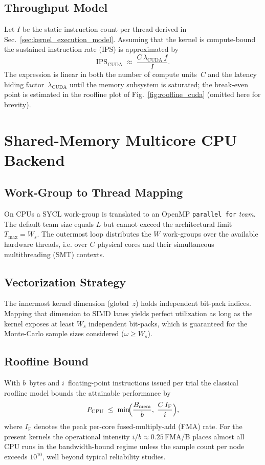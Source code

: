 \subsection{Throughput Model}
Let $I$ be the static instruction count per thread derived in
Sec.~\ref{sec:kernel_execution_model}.  Assuming that the kernel is
compute-bound the sustained instruction rate (IPS) is approximated by
\[
  \text{IPS}_{\text{CUDA}} \;\approx\; \frac{C\,\lambda_{\text{CUDA}}\,f}{I}.
\]
The expression is linear in both the number of compute units~$C$ and the
latency hiding factor~$\lambda_{\text{CUDA}}$ until the memory subsystem is
saturated; the break-even point is estimated in the roofline plot of
Fig.~\ref{fig:roofline_cuda} (omitted here for brevity).

\section{Shared-Memory Multicore CPU Backend}
\label{subsec:cpu_backend}

\subsection{Work-Group to Thread Mapping}
On CPUs a SYCL work-group is translated to an OpenMP \verb|parallel for|
\emph{team}.  The default team size equals $L$ but cannot exceed the
architectural limit $T_{\max}=W_s$.  The outermost loop distributes the $W$
work-groups over the available hardware threads, i.e. over $C$ physical cores
and their simultaneous multithreading (SMT) contexts.

\subsection{Vectorization Strategy}
The innermost kernel dimension (global~$z$) holds independent bit-pack
indices.  Mapping that dimension to SIMD lanes yields perfect utilization as
long as the kernel exposes at least $W_s$ independent bit-packs, which is
guaranteed for the Monte-Carlo sample sizes considered ($\omega\ge W_s$).

\subsection{Roofline Bound}
With $b$~bytes and $i$~floating-point instructions issued per trial the classical roofline
model bounds the attainable performance by
\[
  P_{\text{CPU}} \;\le\; \min\!\Bigl(\frac{B_{\text{mem}}}{b},\;\frac{C\,I_{\text{F}}}{i}\Bigr),
\]
where $I_{\text{F}}$ denotes the peak per-core fused-multiply-add (FMA) rate.
For the present kernels the operational intensity $i/b\approx 0.25\,$FMA/B
places almost all CPU runs in the bandwidth-bound regime unless the sample
count per node exceeds $10^{10}$, well beyond typical reliability studies.

